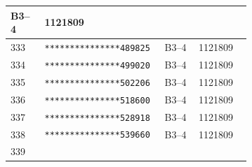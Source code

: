 \documentclass[UTF8,10pt,a4paper,fontset=fandol]{ctexart}
\newcommand{\fieldvalue}[1]{#1}
\begin{document}
\begin{center}
\begin{tabular}{|p{0.13\linewidth}|p{0.22\linewidth}|p{0.13\linewidth}|p{0.20\linewidth}|}
\fieldvalue{B3--4}
&
\fieldvalue{1121809}
&\\
\hline
\fieldvalue{333}
&
\fieldvalue{\texttt{***************489825}}
&
\fieldvalue{B3--4}
&
\fieldvalue{1121809}
&\\
\hline
\fieldvalue{334}
&
\fieldvalue{\texttt{***************499020}}
&
\fieldvalue{B3--4}
&
\fieldvalue{1121809}
&\\
\hline
\fieldvalue{335}
&
\fieldvalue{\texttt{***************502206}}
&
\fieldvalue{B3--4}
&
\fieldvalue{1121809}
&\\
\hline
\fieldvalue{336}
&
\fieldvalue{\texttt{***************518600}}
&
\fieldvalue{B3--4}
&
\fieldvalue{1121809}
&\\
\hline
\fieldvalue{337}
&
\fieldvalue{\texttt{***************528918}}
&
\fieldvalue{B3--4}
&
\fieldvalue{1121809}
&\\
\hline
\fieldvalue{338}
&
\fieldvalue{\texttt{***************539660}}
&
\fieldvalue{B3--4}
&
\fieldvalue{1121809}
&\\
\hline
\fieldvalue{339}
&

\end{tabular}
\end{center}
\end{document}
